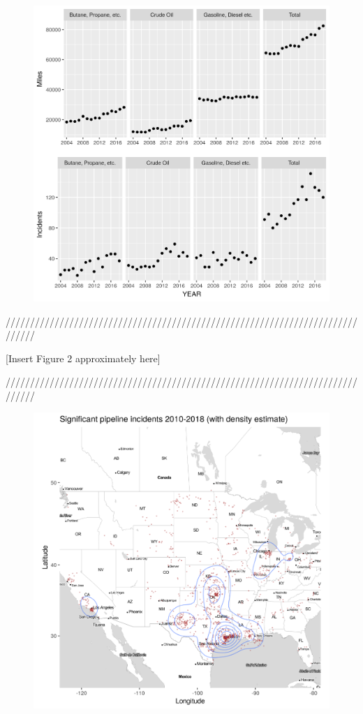 \begin{figure}
	\includegraphics{illustrations/variables.png}
	\caption{}
\end{figure}

{\centering
	//////////////////////////////////////////////////////////////////////////////

	[Insert Figure 2 approximately here]

	//////////////////////////////////////////////////////////////////////////////\par
}

\begin{figure}
		\includegraphics{illustrations/incidents.png}
		\caption{}
\end{figure}

